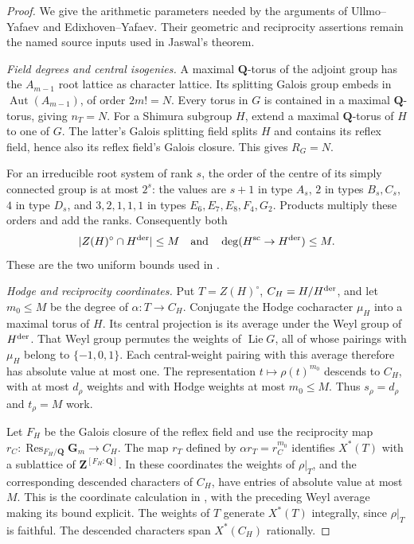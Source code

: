 \documentclass[11pt]{article}
\theoremstyle{definition}
\theoremstyle{remark}
\begin{document}
\begin{proof}
We give the arithmetic parameters needed by the arguments of Ullmo--Yafaev and Edixhoven--Yafaev.  Their geometric and reciprocity assertions remain the
named source inputs used in Jaswal's theorem.

\emph{Field degrees and central isogenies.}
A maximal $\mathbf Q$-torus of the adjoint group has the $A_{m-1}$
root lattice as character lattice.  Its splitting Galois group embeds
in $\operatorname{Aut}(A_{m-1})$, of order $2m!=N$.
Every torus in $G$ is contained in a maximal $\mathbf Q$-torus, giving
$n_T=N$.  For a Shimura subgroup $H$, extend a maximal
$\mathbf Q$-torus of $H$ to one of $G$.  The latter's Galois splitting
field splits $H$ and contains its reflex field, hence also its reflex
field's Galois closure.  This gives $R_G=N$.

For an irreducible root system of rank $s$, the order of the centre of
its simply connected group is at most $2^s$: the values are $s+1$ in
type $A_s$, $2$ in types $B_s,C_s$, $4$ in type $D_s$, and $3,2,1,1,1$
in types $E_6,E_7,E_8,F_4,G_2$.  Products multiply these orders and add
the ranks.  Consequently both
\[
 |Z(H)^\circ\cap H^{\rm der}|\le M
 \quad\hbox{and}\quad
 \deg(H^{\rm sc}\to H^{\rm der})\le M.
\]
These are the two uniform bounds used in
\cite[Lemma~2.4 and the proof of Lemma~2.8, pp.~11 and~17--19]{UllmoYafaev}.

\emph{Hodge and reciprocity coordinates.}
Put $T=Z(H)^\circ$, $C_H=H/H^{\rm der}$, and let
$m_0\le M$ be the degree of $\alpha:T\to C_H$.
Conjugate the Hodge cocharacter $\mu_H$ into a maximal torus of $H$.
Its central projection is its average under the Weyl group of
$H^{\rm der}$.  That Weyl group permutes the weights of
$\operatorname{Lie}G$, all of whose pairings with $\mu_H$ belong to
$\{-1,0,1\}$.  Each central-weight pairing with this average therefore
has absolute value at most one.  The representation
$t\mapsto\rho(t)^{m_0}$ descends to $C_H$, with at most $d_\rho$
weights and with Hodge weights at most $m_0\le M$.
Thus $s_\rho=d_\rho$ and $t_\rho=M$ work.

Let $F_H$ be the Galois closure of the reflex field and use the
reciprocity map
$r_C:\operatorname{Res}_{F_H/\mathbf Q}\mathbf G_m\to C_H$.
The map $r_T$ defined by $\alpha r_T=r_C^{m_0}$ identifies $X^*(T)$
with a sublattice of $\mathbf Z^{[F_H:\mathbf Q]}$.
In these coordinates the weights of $\rho|_T$, and the corresponding
descended characters of $C_H$, have entries of absolute value at most
$M$.  This is the coordinate calculation in
\cite[Lemma~2.6, pp.~12--14]{UllmoYafaev}, with the preceding Weyl average
making its bound explicit.  The weights of $T$ generate $X^*(T)$
integrally, since $\rho|_T$ is faithful.  The descended characters span
$X^*(C_H)$ rationally.


\end{proof}
\end{document}

